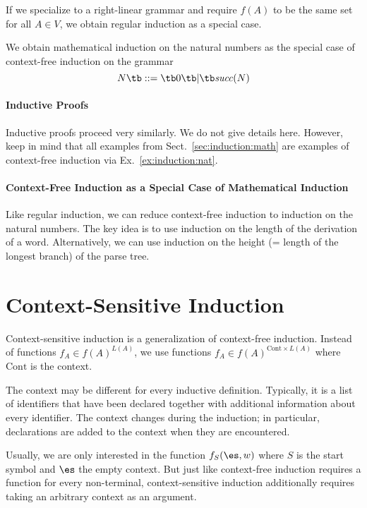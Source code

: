 \begin{example}
If we specialize to a right-linear grammar and require $f(A)$ to be the same set for all $A\in V$, we obtain regular induction as a special case.
\end{example}

\begin{example}\label{ex:induction:nat}
We obtain mathematical induction on the natural numbers as the special case of context-free induction on the grammar
\[N \tb ::= \tb 0\tb|\tb\suc(N)\]
\end{example}

\paragraph{Inductive Proofs}
Inductive proofs proceed very similarly.
We do not give details here.
However, keep in mind that all examples from Sect.~\ref{sec:induction:math} are examples of context-free induction via Ex.~\ref{ex:induction:nat}.

\paragraph{Context-Free Induction as a Special Case of Mathematical Induction}
Like regular induction, we can reduce context-free induction to induction on the natural numbers.
The key idea is to use induction on the length of the derivation of a word.
Alternatively, we can use induction on the height (= length of the longest branch) of the parse tree.

\section{Context-Sensitive Induction}\label{sec:induction:cs}

Context-sensitive induction is a generalization of context-free induction.
Instead of functions $f_A\in f(A)^{L(A)}$, we use functions $f_A\in f(A)^{\mathrm{Cont}\times L(A)}$ where $\mathrm{Cont}$ is the context.

The context may be different for every inductive definition.
Typically, it is a list of identifiers that have been declared together with additional information about every identifier.
The context changes during the induction; in particular, declarations are added to the context when they are encountered.

\begin{remark}
Usually, we are only interested in the function $f_S(\es,w)$ where $S$ is the start symbol and $\es$ the empty context.
But just like context-free induction requires a function for every non-terminal, context-sensitive induction additionally requires taking an arbitrary context as an argument.
\end{remark}

